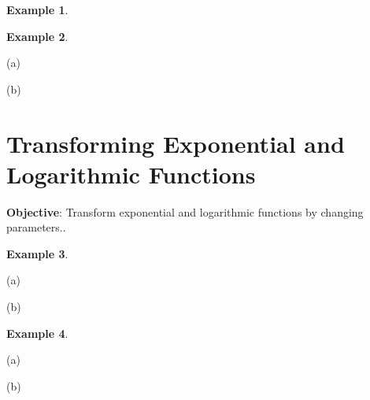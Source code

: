 \documentclass{report}
\theoremstyle{definition}
\newtheorem{example}{\bf Example}
\begin{document}
\begin{example}

\end{example}
\vfill

\begin{example}

\end{example}
(a) 
\vfill

(b) 


\vfill
\noindent{}
 \newpage

 \section{Transforming Exponential and Logarithmic Functions }
 \noindent \hfill\small \noindent \textbf{Objective}: Transform exponential and logarithmic functions by changing parameters.. \normalsize\\
 \setcounter{example}{0}
 \setcounter{definition}{0}

\begin{example}

\end{example}

\begin{minipage}[t]{0.45\linewidth}
(a)  
\end{minipage}
\hfill
\begin{minipage}[t]{0.45\linewidth}
(b) 
\end{minipage}

\vfill

\begin{example}

\end{example}

\begin{minipage}[t]{0.45\linewidth}
(a) 
\end{minipage}
\hfill
\begin{minipage}[t]{0.45\linewidth}
(b) 
\end{minipage}


\vfill
\vfill
 \noindent{}
 \newpage
\end{document}
